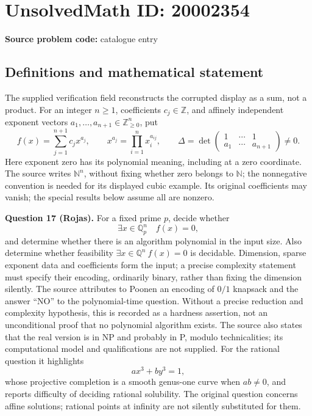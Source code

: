 \documentclass[11pt]{article}
\newcommand{\N}{\mathbb{N}}
\newcommand{\Z}{\mathbb{Z}}
\newcommand{\Q}{\mathbb{Q}}
\begin{document}
\section*{UnsolvedMath ID: 20002354}
\textbf{Source problem code:} catalogue entry
\subsection{Definitions and mathematical statement}
The supplied verification field reconstructs the corrupted display as a sum, not a product. For an integer \(n\geq1\), coefficients \(c_j\in\Z\), and affinely independent exponent vectors \(a_1,\ldots,a_{n+1}\in\Z_{\geq0}^n\), put
\[
 f(x)=\sum_{j=1}^{n+1}c_jx^{a_j},\qquad
 x^{a_j}=\prod_{i=1}^n x_i^{a_{ij}},\qquad
 \Delta=\det\begin{pmatrix}1&\cdots&1\\a_1&\cdots&a_{n+1}\end{pmatrix}\ne0.
\]
Here exponent zero has its polynomial meaning, including at a zero coordinate. The source writes \(\N^n\), without fixing whether zero belongs to \(\N\); the nonnegative convention is needed for its displayed cubic example. Its original coefficients may vanish; the special results below assume all are nonzero.

\textbf{Question 17 (Rojas).} For a fixed prime \(p\), decide whether
\[
 \exists x\in\Q_p^n\quad f(x)=0,
\]
and determine whether there is an algorithm polynomial in the input size. Also determine whether feasibility \(\exists x\in\Q^n\ f(x)=0\) is decidable. Dimension, sparse exponent data and coefficients form the input; a precise complexity statement must specify their encoding, ordinarily binary, rather than fixing the dimension silently. The source attributes to Poonen an encoding of \(0/1\) knapsack and the answer ``NO'' to the polynomial-time question. Without a precise reduction and complexity hypothesis, this is recorded as a hardness assertion, not an unconditional proof that no polynomial algorithm exists. The source also states that the real version is in NP and probably in P, modulo technicalities; its computational model and qualifications are not supplied. For the rational question it highlights
\[
 ax^3+by^3=1,
\]
whose projective completion is a smooth genus-one curve when \(ab\ne0\), and reports difficulty of deciding rational solubility. The original question concerns affine solutions; rational points at infinity are not silently substituted for them.
\end{document}
